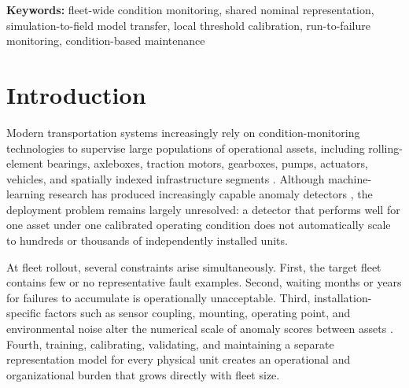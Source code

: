 \documentclass[11pt,a4paper]{article}
\begin{document}
\begin{abstract}
\textbf{Novelty:} The contribution is a fleet-deployment methodology, not a
new anomaly-detection architecture: it separates representation learning,
performed once and shared fleet-wide, from decision-boundary calibration,
performed independently by each asset.

\textbf{Practical Applications:} A shared representation can be developed
and maintained centrally, for example by an original equipment
manufacturer, and distributed unchanged across an operator's fleet, while
each installed asset requires only seconds of unsupervised local
calibration and lightweight edge inference, removing the need for fault
labels or per-asset model training during rollout.

\end{abstract}

\vspace{0.3cm}
\noindent\textbf{Keywords:}
fleet-wide condition monitoring,
shared nominal representation,
simulation-to-field model transfer,
local threshold calibration,
run-to-failure monitoring,
condition-based maintenance

\section{Introduction}
\label{sec:introduction}

Modern transportation systems increasingly rely on condition-monitoring technologies to supervise
large populations of operational assets, including rolling-element bearings, axleboxes, traction
motors, gearboxes, pumps, actuators, vehicles, and spatially indexed infrastructure segments
\cite{jardine2006,zhao2019}. Although machine-learning research has produced increasingly capable
anomaly detectors \cite{chandola2009,zhao2019}, the deployment problem remains largely unresolved:
a detector that performs well for one asset under one calibrated operating condition does not
automatically scale to hundreds or thousands of independently installed units.

At fleet rollout, several constraints arise simultaneously. First, the target fleet contains few
or no representative fault examples. Second, waiting months or years for failures to accumulate
is operationally unacceptable. Third, installation-specific factors such as sensor coupling,
mounting, operating point, and environmental noise alter the numerical scale of anomaly scores
between assets \cite{randall2011}. Fourth, training, calibrating, validating, and maintaining a
separate representation model for every physical unit creates an operational and organizational
burden that grows directly with fleet size.
\end{document}
